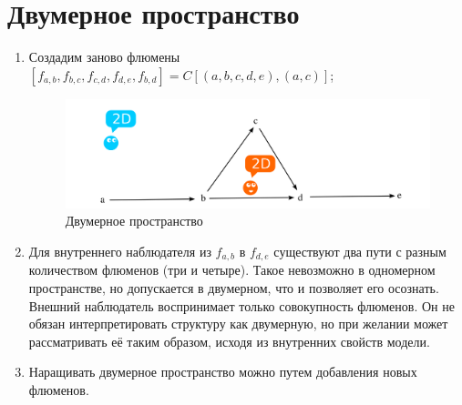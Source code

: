 \documentclass[final]{article}
\begin{document}
    \section{Двумерное пространство}
        \begin{enumerate}

            \item Создадим заново флюмены \( 
            [f_{a,b},f_{b,c},f_{c,d},f_{d,e},f_{b,d}]=C[(a,b,c,d,e),(a,c)] \);

            \begin{figure}[H]
                \centering
                \includegraphics[width=\textwidth]{./2d-f1f2f3.png}
                \caption{Двумерное пространство}
                \label{fig:image}
            \end{figure}

            \item Для внутреннего наблюдателя из \( f_{a,b} \) в \( f_{d,e} \) 
            существуют два пути с разным количеством флюменов (три и четыре). Такое 
            невозможно в одномерном пространстве, но допускается в двумерном, что и 
            позволяет его осознать. Внешний наблюдатель воспринимает только 
            совокупность флюменов. Он не обязан интерпретировать структуру как 
            двумерную, но при желании может рассматривать её таким образом, исходя 
            из внутренних свойств модели.

            \item Наращивать двумерное пространство можно путем добавления новых флюменов.
        \end{enumerate}
\end{document}
